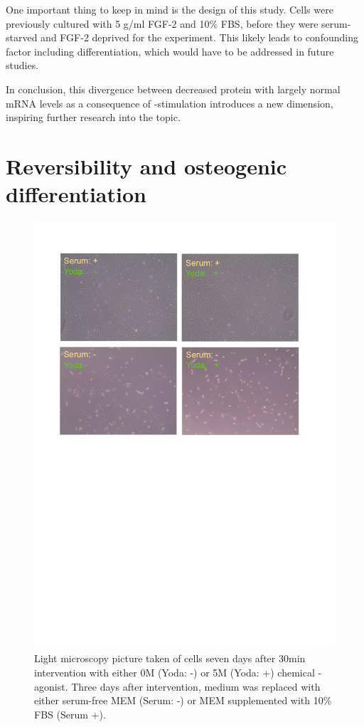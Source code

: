 One important thing to keep in mind is the design of this study. Cells were previously cultured with 5 \textmu{}g/ml FGF-2 and 10\% FBS, before they were serum-starved and FGF-2 deprived for the experiment. This likely leads to confounding factor including differentiation, which would have to be addressed in future studies.\par

In conclusion, this divergence between decreased protein with largely normal mRNA levels as a consequence of \Piezo{}-stimulation introduces a new dimension, inspiring further research into the topic.

\section{Reversibility and osteogenic differentiation}

\begin{figure}[ht]
	\centering
	\includegraphics[width = \linewidth{}]{LongTerm_CellPicture.png}
	\caption{
		Light microscopy picture taken of cells seven days after 30min intervention with either  0\textmu{}M (Yoda: -) or 5\textmu{}M (Yoda: +) chemical \Piezo{}-agonist. Three days after intervention, medium was replaced with either serum-free MEM\textalpha{} (Serum: -) or MEM\textalpha{} supplemented with 10\% FBS (Serum +).}
	\label{pic:Cells_LongTerm}
\end{figure}

